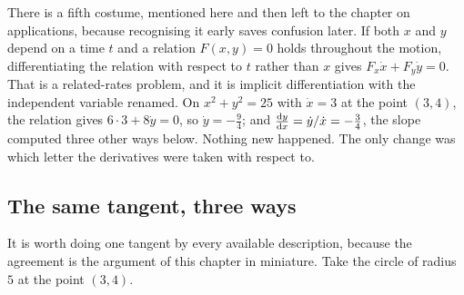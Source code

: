 \begin{center}
\end{center}

There is a fifth costume, mentioned here and then left to the chapter on applications, because recognising it early saves confusion later. If both $x$ and $y$ depend on a time $t$ and a relation $F(x,y)=0$ holds throughout the motion, differentiating the relation with respect to $t$ rather than $x$ gives $F_{x}\dot x+F_{y}\dot y=0$. That is a related-rates problem, and it is implicit differentiation with the independent variable renamed. On $x^{2}+y^{2}=25$ with $\dot x=3$ at the point $(3,4)$, the relation gives $6\cdot3+8\dot y=0$, so $\dot y=-\tfrac94$; and $\frac{\mathrm{d}y}{\mathrm{d}x}=\dot y/\dot x=-\tfrac34$, the slope computed three other ways below. Nothing new happened. The only change was which letter the derivatives were taken with respect to.

\subsection{The same tangent, three ways}

It is worth doing one tangent by every available description, because the agreement is the argument of this chapter in miniature. Take the circle of radius $5$ at the point $(3,4)$.


